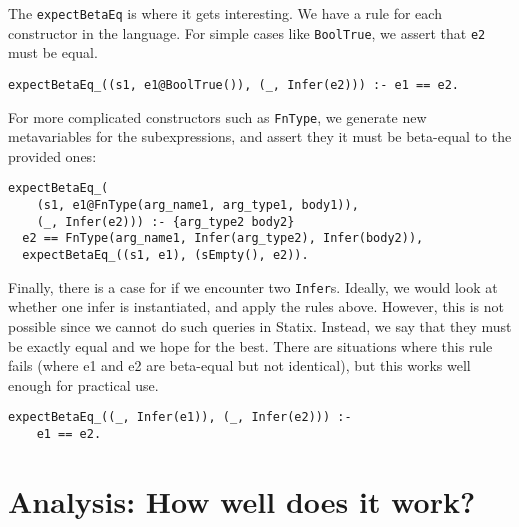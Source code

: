The \verb|expectBetaEq| is where it gets interesting. We have a rule for each constructor in the language. For simple cases like \verb|BoolTrue|, we assert that \verb|e2| must be equal.
\begin{lstlisting}
expectBetaEq_((s1, e1@BoolTrue()), (_, Infer(e2))) :- e1 == e2.
\end{lstlisting}
For more complicated constructors such as \verb|FnType|, we generate new metavariables for the subexpressions, and assert they it must be beta-equal to the provided ones:
\begin{lstlisting}
expectBetaEq_(
	(s1, e1@FnType(arg_name1, arg_type1, body1)), 
	(_, Infer(e2))) :- {arg_type2 body2}
  e2 == FnType(arg_name1, Infer(arg_type2), Infer(body2)),
  expectBetaEq_((s1, e1), (sEmpty(), e2)).
\end{lstlisting}

Finally, there is a case for if we encounter two \verb|Infer|s. Ideally, we would look at whether one infer is instantiated, and apply the rules above. However, this is not possible since we cannot do such queries in Statix. Instead, we say that they must be exactly equal and we hope for the best. There are situations where this rule fails (where e1 and e2 are beta-equal but not identical), but this works well enough for practical use.
\begin{lstlisting}
expectBetaEq_((_, Infer(e1)), (_, Infer(e2))) :-
    e1 == e2.
\end{lstlisting}

\section{Analysis: How well does it work?}